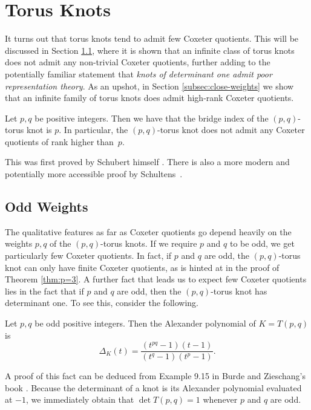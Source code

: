 \documentclass[main.tex]{subfiles}
\begin{document}
\section{Torus Knots}\label{sec:torus-knots}
It turns out that torus knots tend to admit few Coxeter quotients. This will be discussed in Section \ref{subsec:odd-weights}, where it is shown that an infinite class of torus knots does not admit any non-trivial Coxeter quotients, further adding to the potentially familiar statement that \textit{knots of determinant one admit poor representation theory}. As an upshot, in Section \ref{subsec:close-weights} we show that an infinite family of torus knots does admit high-rank Coxeter quotients.

\begin{proposition}
Let $p, q$ be positive integers. Then we have that the bridge index of the $(p, q)$-torus knot is $p$. In particular, the $(p, q)$-torus knot does not admit any Coxeter quotients of rank higher than~$p$.
\end{proposition}

This was first proved by Schubert himself \cite{schubert1954}.
There is also a more modern and potentially more accessible proof by Schultens~\cite{schultens2007}.

\subsection{Odd Weights}\label{subsec:odd-weights}
The qualitative features as far as Coxeter quotients go depend heavily on the weights $p, q$ of the $(p, q)$-torus knots. If we require $p$ and $q$ to be odd, we get particularly few Coxeter quotients. In fact, if $p$ and $q$ are odd, the $(p,q)$-torus knot can only have finite Coxeter quotients, as is hinted at in the proof of Theorem \ref{thm:p=3}. A further fact that leads us to expect few Coxeter quotients lies in the fact that if $p$ and $q$ are odd, then the $(p, q)$-torus knot has determinant one. To see this, consider the following.

\begin{theorem}
Let $p, q$ be odd positive integers. Then the Alexander polynomial of $K = T(p, q)$ is
$$\Delta_K(t) = \frac{(t^{pq}-1)(t-1)}{(t^q-1)(t^p-1)}.$$
\end{theorem}

A proof of this fact can be deduced from Example 9.15 in Burde and Zieschang's book \cite{burde2003}.
Because the determinant of a knot is its Alexander polynomial evaluated at $-1$, we immediately obtain that $\det T(p, q) = 1$ whenever $p$ and $q$ are odd.
\end{document}
